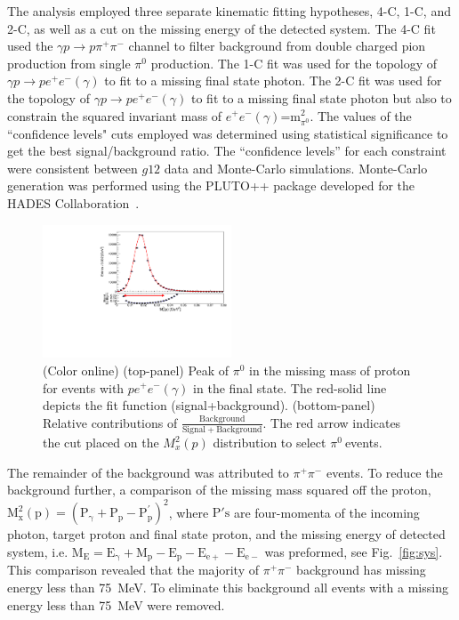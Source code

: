 \documentclass[aps,prc,twocolumn,floatfix,showpacs,preprintnumbers,amsmath,amssymb,superscriptaddress,linenumbers]{revtex4-1}
\def\pizT{$\pi^{0} \ $}
\begin{document}
The analysis employed three separate kinematic fitting 
hypotheses, 4-C, 1-C, and 2-C, as well as a cut on the missing 
energy of the detected system. The 4-C fit used the $\gamma 
p\rightarrow p\pi^+\pi^-$ channel to filter background from double 
charged pion production from single $\pi^0$ production. The 1-C fit
was used for the topology of $\gamma p\rightarrow pe^+e^-(\gamma)$ 
to fit to a missing final state photon.  The 2-C fit was used for 
the topology of $\gamma p\rightarrow pe^+e^-(\gamma)$ to fit to a 
missing final state photon but also to constrain the squared invariant 
mass of $e^+e^-(\gamma)$=m$^2_{\pi^0}$. The values of 
the ``confidence levels" cuts employed was determined using 
statistical significance to get the best signal/background ratio.
 The ``confidence levels'' for each constraint were consistent 
between $g12$ data and Monte-Carlo simulations. 
Monte-Carlo generation was performed using the PLUTO++ package 
developed for the HADES Collaboration~\cite{PLUTO}.
\begin{figure}[htb!]
\centerline{
        \includegraphics[height=0.35\textwidth,width=0.5\textwidth]{G12_Pi0_wBck.pdf}}

        \caption {(Color online) (top-panel) Peak of $\pi^0$ in the missing
        mass of proton for events with $pe^+e^-(\gamma)$ in the final state.
        The red-solid line depicts the fit function (signal+background).
        (bottom-panel) Relative contributions of $\frac{\mathrm{Background}}
        {\mathrm{Signal + Background}}$. The red arrow indicates the cut
        placed on the $M_x^2(p)$ distribution to select \pizT events.}
        \label{fig:pi0_peak}
\end{figure}

The remainder of the background was attributed to $\pi^+\pi^-$
events. To reduce the background further, a comparison of the 
missing mass squared off the proton, $\mathrm{M_x^2(p) =(P_\gamma + P_p -P^{'}_p)^2}$, where $\mathrm{P's}$ are four-momenta of the incoming photon, target proton and final state proton, and the missing energy of detected system, i.e. $\mathrm{M_E = E_\gamma +M_p -E_p-E_{e+} - E_{e-}}$ was preformed, see Fig.~\ref{fig:sys}. This 
comparison revealed that the majority of $\pi^+\pi^-$ background 
has missing energy less than 75~MeV. To eliminate this background 
all events with a missing energy less than 75~MeV were removed.
\end{document}
